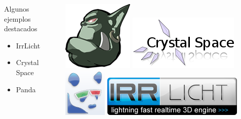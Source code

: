 \begin{frame}
\begin{columns}[c]
\begin{block}{Algunos ejemplos destacados}
\begin{itemize}
							\item IrrLicht
							\item Crystal Space
							\item Panda
            \end{itemize}            
        \end{block}        
		\column{150pt}
		\begin{center}
			\includegraphics[scale=0.30]{img/ogre.png}
			\hspace{0.20cm}
			\includegraphics[scale=0.40]{img/crystal.png}
			\newline
			\newline
			\includegraphics[scale=0.50]{img/panda.png}
			\hspace{0.60cm}
			\includegraphics[scale=1.20]{img/irrlicht.png}
		\end{center}
	\end{columns} 

\end{frame}


